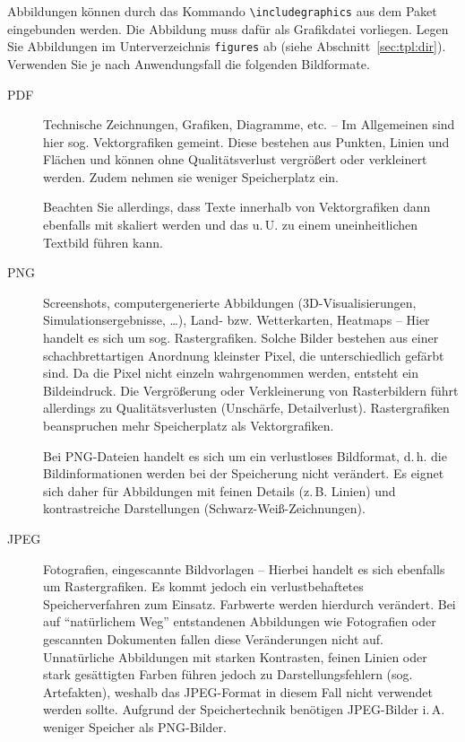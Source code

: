Abbildungen können durch das Kommando \lstinline+\includegraphics+ aus dem
Paket~ eingebunden werden. Die Abbildung muss dafür als Grafikdatei
vorliegen. Legen Sie Abbildungen im Unterverzeichnis \texttt{figures} ab
(siehe Abschnitt~\ref{sec:tpl:dir}). Verwenden Sie je nach Anwendungsfall die
folgenden Bildformate.

\begin{description}
\item[PDF] Technische Zeichnungen, Grafiken, Diagramme, etc. -- Im Allgemeinen
  sind hier sog. Vektorgrafiken gemeint. Diese bestehen aus Punkten, Linien
  und Flächen und können ohne Qualitätsverlust vergrößert oder verkleinert
  werden. Zudem nehmen sie weniger Speicherplatz ein.

  Beachten Sie allerdings, dass Texte innerhalb von Vektorgrafiken dann
  ebenfalls mit skaliert werden und das u.\,U. zu einem uneinheitlichen
  Textbild führen kann.

\item[PNG] Screenshots, computergenerierte Abbildungen (3D-Visualisierungen,
  Simulationsergebnisse, \dots), Land- bzw. Wetterkarten, Heatmaps -- Hier
  handelt es sich um sog. Rastergrafiken. Solche Bilder bestehen aus einer
  schachbrettartigen Anordnung kleinster Pixel, die unterschiedlich gefärbt
  sind. Da die Pixel nicht einzeln wahrgenommen werden, entsteht ein
  Bildeindruck. Die Vergrößerung oder Verkleinerung von Rasterbildern führt
  allerdings zu Qualitätsverlusten (Unschärfe, Detailverlust). Rastergrafiken
  beanspruchen mehr Speicherplatz als Vektorgrafiken.

  Bei PNG-Dateien handelt es sich um ein verlustloses Bildformat, d.\,h. die
  Bildinformationen werden bei der Speicherung nicht verändert. Es eignet sich
  daher für Abbildungen mit feinen Details (z.\,B. Linien) und kontrastreiche
  Darstellungen (Schwarz-Weiß-Zeichnungen).

\item[JPEG] Fotografien, eingescannte Bildvorlagen -- Hierbei handelt es sich
  ebenfalls um Rastergrafiken. Es kommt jedoch ein verlustbehaftetes
  Speicherverfahren zum Einsatz. Farbwerte werden hierdurch verändert. Bei
  auf "`natürlichem Weg"' entstandenen Abbildungen wie Fotografien oder
  gescannten Dokumenten fallen diese Veränderungen nicht auf. Unnatürliche
  Abbildungen mit starken Kontrasten, feinen Linien oder stark gesättigten
  Farben führen jedoch zu Darstellungsfehlern (sog. Artefakten), weshalb das
  JPEG-Format in diesem Fall nicht verwendet werden sollte. Aufgrund der
  Speichertechnik benötigen JPEG-Bilder i.\,A. weniger Speicher als PNG-Bilder.
\end{description}

